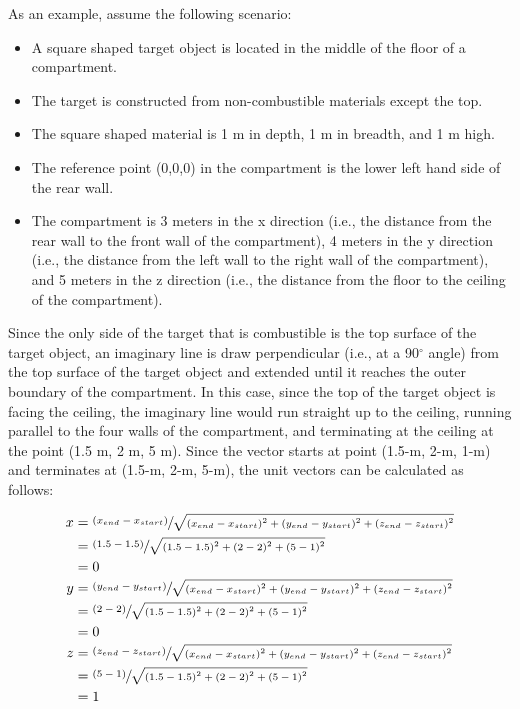 As an example, assume the following scenario:

\begin{itemize}
\item A square shaped target object is located in the middle of the floor of a compartment.
\item The target is constructed from non-combustible materials except the top.
\item The square shaped material is 1 m in depth, 1 m in breadth, and 1 m high.
\item The reference point (0,0,0) in the compartment is the lower left hand side of the rear wall.
\item The compartment is 3 meters in the x direction (i.e., the distance from the rear wall to the front wall of the compartment), 4 meters in the y direction (i.e., the distance from the left wall to the right wall of the compartment), and 5 meters in the z direction (i.e., the distance from the floor to the ceiling of the compartment).
\end{itemize}

Since the only side of the target that is combustible is the top surface of the target object, an imaginary line is draw perpendicular (i.e., at a 90$^\circ$ angle) from the top surface of the target object and extended until it reaches the outer boundary of the compartment.  In this case, since the top of the target object is facing the ceiling, the imaginary line would run straight up to the ceiling, running parallel to the four walls of the compartment, and terminating at the ceiling at the point (1.5 m, 2 m, 5 m).  Since the vector starts at point (1.5-m, 2-m, 1-m) and terminates at (1.5-m, 2-m, 5-m), the unit vectors can be calculated as follows:


\begin{equation}
  \begin{aligned}
 x &= \sfrac{{ \left( {x_{end} - x_{start}} \right) }}{\sqrt{{ \left( {x_{end} - x_{start}} \right) }^2 + { \left( {y_{end} - y_{start}} \right) }^2 + { \left( {z_{end} - z_{start}} \right) }^2}} \\
 &= \sfrac{{ \left( {1.5 - 1.5} \right) }}{\sqrt{{ \left( {1.5 - 1.5} \right) }^2 + { \left( {2 - 2} \right) }^2 + { \left( {5 - 1} \right) }^2}} \\
 &= 0\\
 y &= \sfrac{{ \left( {y_{end} - y_{start}} \right) }}{\sqrt{{ \left( {x_{end} - x_{start}} \right) }^2 + { \left( {y_{end} - y_{start}} \right) }^2 + { \left( {z_{end} - z_{start}} \right) }^2}} \\
 &= \sfrac{{ \left( {2 - 2} \right) }}{\sqrt{{ \left( {1.5 - 1.5} \right) }^2 + { \left( {2 - 2} \right) }^2 + { \left( {5 - 1} \right) }^2}} \\
 &= 0 \\
 z &= \sfrac{{ \left( {z_{end} - z_{start}} \right) }}{\sqrt{{ \left( {x_{end} - x_{start}} \right) }^2 + { \left( {y_{end} - y_{start}} \right) }^2 + { \left( {z_{end} - z_{start}} \right) }^2}} \\ 
 &= \sfrac{{ \left( {5 - 1} \right) }}{\sqrt{{ \left( {1.5 - 1.5} \right) }^2 + { \left( {2 - 2} \right) }^2 + { \left( {5 - 1} \right) }^2}} \\
 &= 1\\
  \end{aligned}
\end{equation}

